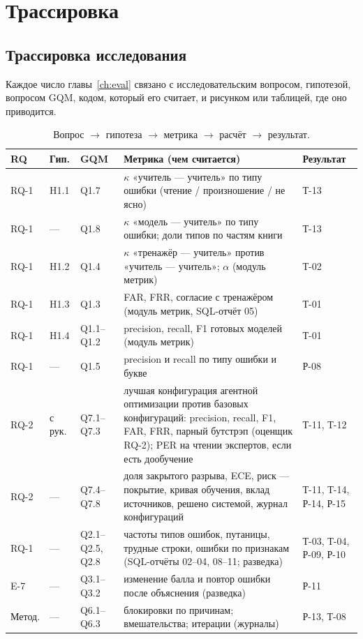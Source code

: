 \chapter{Трассировка}\label{app:trace}

\section{Трассировка исследования}

Каждое число главы~\ref{ch:eval} связано с исследовательским вопросом, гипотезой, вопросом GQM, кодом,
который его считает, и рисунком или таблицей, где оно приводится.

\begin{table}[ht]
\centering\small
\caption{Вопрос $\to$ гипотеза $\to$ метрика $\to$ расчёт $\to$ результат.}
\begin{tabularx}{\linewidth}{@{}lllLl@{}}
\toprule
RQ & Гип. & GQM & Метрика (чем считается) & Результат \\
\midrule
RQ-1 & H1.1 & Q1.7 & $\kappa$ «учитель --- учитель» по типу ошибки (чтение / произношение / не ясно) & Т-13 \\
RQ-1 & --- & Q1.8 & $\kappa$ «модель --- учитель» по типу ошибки; доли типов по частям книги & Т-13 \\
RQ-1 & H1.2 & Q1.4 & $\kappa$ «тренажёр --- учитель» против «учитель --- учитель»; $\alpha$ (модуль метрик) & Т-02 \\
RQ-1 & H1.3 & Q1.3 & FAR, FRR, согласие с тренажёром (модуль метрик, SQL-отчёт 05) & Т-01 \\
RQ-1 & H1.4 & Q1.1--Q1.2 & precision, recall, F1 готовых моделей (модуль метрик) & Т-01 \\
RQ-1 & --- & Q1.5 & precision и recall по типу ошибки и букве & Р-08 \\
RQ-2 & с рук. & Q7.1--Q7.3 & лучшая конфигурация агентной оптимизации против базовых конфигураций: precision, recall, F1, FAR, FRR, парный бутстрэп (оценщик RQ-2); PER на чтении экспертов, если есть дообучение & Т-11, Т-12 \\
RQ-2 & --- & Q7.4--Q7.8 & доля закрытого разрыва, ECE, риск --- покрытие, кривая обучения, вклад источников, решено системой, журнал конфигураций & Т-11, Т-14, Р-14, Р-15 \\
RQ-1 & --- & Q2.1--Q2.5, Q2.8 & частоты типов ошибок, путаницы, трудные строки, ошибки по признакам (SQL-отчёты 02--04, 08--11; разведка) & Т-03, Т-04, Р-09, Р-10 \\
E-7 & --- & Q3.1--Q3.2 & изменение балла и повтор ошибки после объяснения (разведка) & Р-11 \\
Метод. & --- & Q6.1--Q6.3 & блокировки по причинам; вмешательства; итерации (журналы) & Р-13, Т-08 \\
\bottomrule
\end{tabularx}
\end{table}

